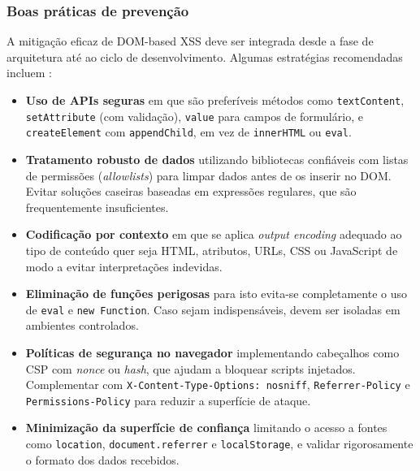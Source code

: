 \subsubsection{Boas práticas de prevenção}
\label{subsubsec:boas-praticas-prevencao-dom-xss}

A mitigação eficaz de DOM-based XSS deve ser integrada desde a fase de arquitetura até ao ciclo de desenvolvimento. Algumas estratégias recomendadas incluem \cite{ref31, ref32}:

\begin{itemize}
    \item \textbf{Uso de APIs seguras} em que são preferíveis métodos como \texttt{textContent}, \texttt{setAttribute} (com validação), \texttt{value} para campos de formulário, e \texttt{createElement} com \texttt{appendChild}, em vez de \texttt{innerHTML} ou \texttt{eval}.
    
    \item \textbf{Tratamento robusto de dados} utilizando bibliotecas confiáveis com listas de permissões (\textit{allowlists}) para limpar dados antes de os inserir no DOM. Evitar soluções caseiras baseadas em expressões regulares, que são frequentemente insuficientes.
    
    \item \textbf{Codificação por contexto} em que se aplica \textit{output encoding} adequado ao tipo de conteúdo quer seja HTML, atributos, URLs, CSS ou JavaScript de modo a evitar interpretações indevidas.
    
    \item \textbf{Eliminação de funções perigosas} para isto evita-se completamente o uso de \texttt{eval} e \texttt{new Function}. Caso sejam indispensáveis, devem ser isoladas em ambientes controlados.
    
    \item \textbf{Políticas de segurança no navegador} implementando cabeçalhos como CSP com \textit{nonce} ou \textit{hash}, que ajudam a bloquear scripts injetados. Complementar com \texttt{X-Content-Type-Options: nosniff}, \texttt{Referrer-Policy} e \texttt{Permissions-Policy} para reduzir a superfície de ataque.
    
    \item \textbf{Minimização da superfície de confiança} limitando o acesso a fontes como \texttt{location}, \texttt{document.referrer} e \texttt{localStorage}, e validar rigorosamente o formato dos dados recebidos.
\end{itemize}

